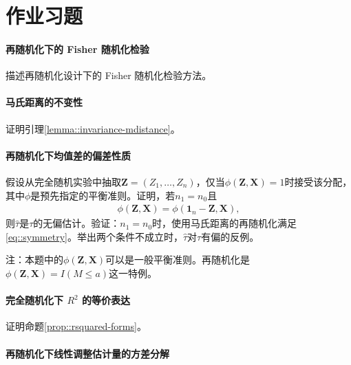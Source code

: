 \section{作业习题}

\paragraph{再随机化下的 Fisher 随机化检验}\label{hw::FRT-under-REM}

描述再随机化设计下的 Fisher 随机化检验方法。


\paragraph{马氏距离的不变性}\label{para::invariance-M}

证明引理\ref{lemma::invariance-mdistance}。 


\paragraph{再随机化下均值差的偏差性质}\label{hw::unbiasednessof-tauhat-rerandom}

假设从完全随机实验中抽取$\bm{Z} = (Z_1, \ldots, Z_n)$，仅当$\phi(\bm{Z}, \bm{X}) = 1$时接受该分配，其中$\phi$是预先指定的平衡准则。证明，若$n_1 = n_0$且
\begin{eqnarray}
\phi(\bm{Z}, \bm{X}) = \phi(\bm{1}_n-\bm{Z}, \bm{X}), \label{eq::symmetry}
\end{eqnarray}
则$\hat{\tau}$是$\tau$的无偏估计。验证：$n_1 = n_0$时，使用马氏距离的再随机化满足\eqref{eq::symmetry}。举出两个条件不成立时，$\hat{\tau}$对$\tau$有偏的反例。  


注：本题中的$\phi(\bm{Z}, \bm{X}) $可以是一般平衡准则。再随机化是$\phi(\bm{Z}, \bm{X})  =  I(M\leq a) $这一特例。


\paragraph{完全随机化下 $R^2$ 的等价表达}\label{para::r2-cre}

证明命题\ref{prop::rsquared-forms}。 



\paragraph{再随机化下线性调整估计量的方差分解}\label{hw::projection-po-onto-x}



